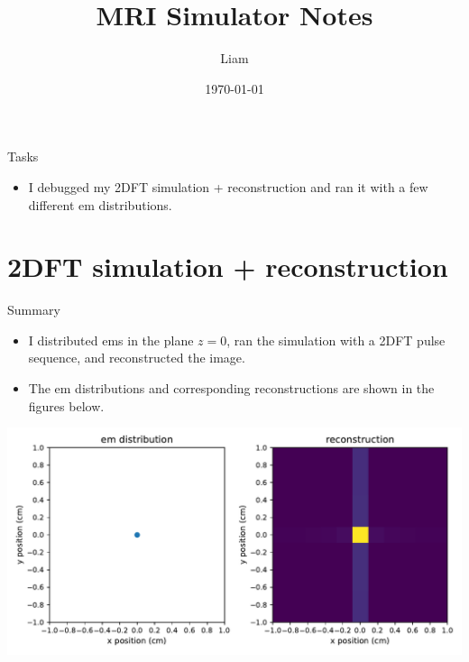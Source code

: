 \documentclass[dvipsnames]{beamer}
\title{MRI Simulator Notes}
\author{Liam}
\date{\today}
\begin{document}
\begin{frame}
\maketitle
\end{frame}

\begin{frame}{Tasks}
\begin{itemize}
\item I debugged my 2DFT simulation + reconstruction and ran it with a few different em distributions.
\end{itemize}
\end{frame}

\section{2DFT simulation + reconstruction}

\begin{frame}{Summary}
\begin{itemize}
\item I distributed ems in the plane $z = 0$, ran the simulation with a 2DFT pulse sequence, and reconstructed the image.
\item The em distributions and corresponding reconstructions are shown in the figures below.
\end{itemize}
\end{frame}

\begin{frame}
\begin{center}
\includegraphics[width=\textwidth]{reconstruction_ems-origin}
\end{center}
\end{frame}
\end{document}
